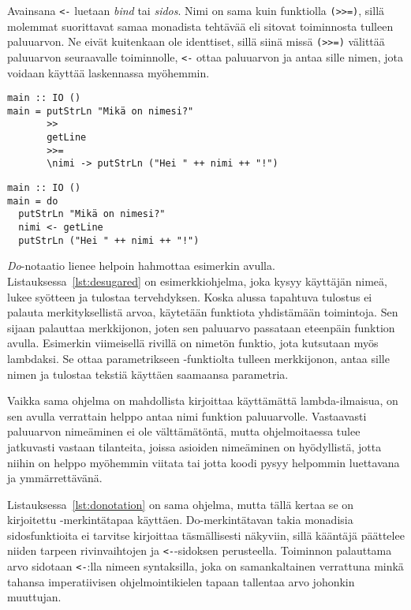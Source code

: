 \documentclass[finnish]{tktltiki2}
\begin{document}
Avainsana \verb|<-| luetaan \emph{bind} tai \emph{sidos}. Nimi on sama kuin funktiolla \verb|(>>=)|,
sillä molemmat suorittavat samaa monadista tehtävää eli sitovat toiminnosta tulleen paluuarvon. Ne
eivät kuitenkaan ole identtiset, sillä siinä missä \verb|(>>=)| välittää paluuarvon seuraavalle
toiminnolle, \verb|<-| ottaa paluuarvon ja antaa sille nimen, jota voidaan käyttää laskennassa
myöhemmin.

\begin{lstlisting}[float,label={lst:desugared},caption={Funktionaalinen tyyli}]
main :: IO ()
main = putStrLn "Mikä on nimesi?"
       >>
       getLine
       >>=
       \nimi -> putStrLn ("Hei " ++ nimi ++ "!")
\end{lstlisting}

\begin{lstlisting}[float,label={lst:donotation},caption={Imperatiivinen tyyli ja do-merkintätapa}]
main :: IO ()
main = do
  putStrLn "Mikä on nimesi?"
  nimi <- getLine
  putStrLn ("Hei " ++ nimi ++ "!")
\end{lstlisting}

\emph{Do}-notaatio lienee helpoin hahmottaa esimerkin avulla. Listauksessa~\ref{lst:desugared} on
esimerkkiohjelma, joka kysyy käyttäjän nimeä, lukee syötteen ja tulostaa tervehdyksen. Koska alussa
tapahtuva tulostus ei palauta merkityksellistä arvoa, käytetään funktiota  yhdistämään
toimintoja. Sen sijaan  palauttaa merkkijonon, joten sen paluuarvo passataan eteenpäin
funktion  avulla. Esimerkin viimeisellä rivillä on nimetön funktio, jota kutsutaan myös
lambdaksi. Se ottaa parametrikseen -funktiolta tulleen merkkijonon, antaa sille nimen
 ja tulostaa tekstiä käyttäen saamaansa parametria.

Vaikka sama ohjelma on mahdollista kirjoittaa käyttämättä lambda-ilmaisua, on sen avulla verrattain
helppo antaa nimi funktion  paluuarvolle. Vastaavasti paluuarvon nimeäminen ei ole
välttämätöntä, mutta ohjelmoitaessa tulee jatkuvasti vastaan tilanteita, joissa asioiden nimeäminen
on hyödyllistä, jotta niihin on helppo myöhemmin viitata tai jotta koodi pysyy helpommin luettavana
ja ymmärrettävänä.


Listauksessa~\ref{lst:donotation} on sama ohjelma, mutta tällä kertaa se on kirjoitettu
-merkintätapaa käyttäen. Do-merkintätavan takia monadisia sidosfunktioita ei tarvitse
kirjoittaa täsmällisesti näkyviin, sillä kääntäjä päättelee niiden tarpeen rivinvaihtojen ja
\verb|<-|-sidoksen perusteella. Toiminnon  palauttama arvo sidotaan \verb|<-|:lla
nimeen syntaksilla, joka on samankaltainen verrattuna minkä tahansa imperatiivisen ohjelmointikielen
tapaan tallentaa arvo johonkin muuttujan.
\end{document}
